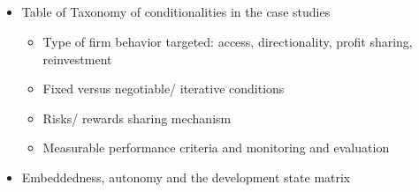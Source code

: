 \documentclass[10pt]{article} %
\begin{document}
    \subsection{\cite{MazzucatoRodrik2023}}
    \begin{itemize}
        \item Table of Taxonomy of conditionalities in the case studies
            \begin{itemize}
                \item Type of firm behavior targeted: access, directionality, profit sharing, reinvestment
                \item Fixed versus negotiable/ iterative conditions
                \item Risks/ rewards sharing mechanism
                \item Measurable performance criteria and monitoring and evaluation
            \end{itemize}
        \item Embeddedness, autonomy and the development state matrix
    \end{itemize}
\end{document}
